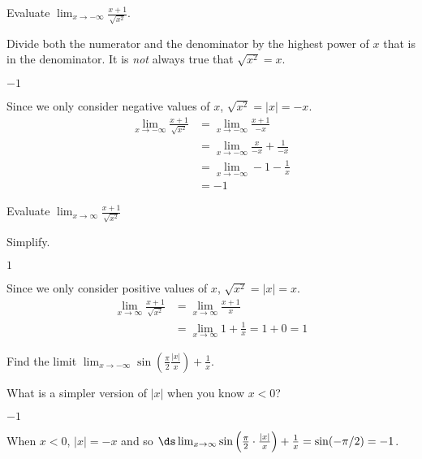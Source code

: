 \begin{Mquestion}Evaluate $\displaystyle\lim_{x \rightarrow -\infty}\frac{x+1}{\sqrt{x^2}}$.
\end{Mquestion}
\begin{hint}
Divide both the numerator and the denominator by the highest
         power of $x$ that is in the denominator.
It is \emph{not} always true that $\sqrt{x^2}=x$.
\end{hint}
\begin{answer} $-1$
\end{answer}
\begin{solution}
Since we only consider negative values of $x$, $\sqrt{x^2}=|x|=-x$.
\begin{align*}
\displaystyle\lim_{x \rightarrow -\infty}\frac{x+1}{\sqrt{x^2}}&=
\displaystyle\lim_{x \rightarrow -\infty}\frac{x+1}{-x}\\
&=\displaystyle\lim_{x \rightarrow -\infty}\frac{x}{-x}+\frac{1}{-x}\\
&=\displaystyle\lim_{x \rightarrow -\infty}-1-\frac{1}{x}\\
&=-1
\end{align*}
\end{solution}




\begin{Mquestion}Evaluate $\displaystyle\lim_{x \rightarrow \infty}\frac{x+1}{\sqrt{x^2}}$
\end{Mquestion}
\begin{hint} Simplify.
\end{hint}
\begin{answer} $1$
\end{answer}
\begin{solution}
Since we only consider positive values of $x$, $\sqrt{x^2}=|x|=x$.
\begin{align*}
\displaystyle\lim_{x \rightarrow \infty}\frac{x+1}{\sqrt{x^2}}&=
\displaystyle\lim_{x \rightarrow \infty}\frac{x+1}{x}\\
&=\displaystyle\lim_{x \rightarrow \infty}1+\frac{1}{x}=1+0=1
\end{align*}
\end{solution}



\begin{question}[2015Q]
Find the limit $\displaystyle \lim_{x\to -\infty} \sin\left( \frac{\pi}{2}
\frac{|x|}{x}\right) + \frac{1}{x}$.
\end{question}
\begin{hint}
What is a simpler version of $|x|$ when you know $x<0$?
\end{hint}
\begin{answer}
$-1$
\end{answer}
\begin{solution}
When $x<0$, $|x|=-x$ and so $\ds\lim_{x\to\infty}\sin\left( \frac{\pi}{2} \cdot
\frac{|x|}{x}\right) + \frac{1}{x} = \sin(-\pi/2) = -1$.
\end{solution}




